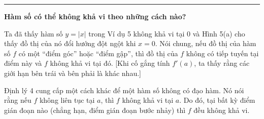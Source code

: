 \vspace{1.8em}
\noindent\textcolor{stewartblue}{\rule{1.25ex}{1.25ex}}\hspace{0.6em}%
{\large\textbf{\textsf{Hàm số có thể không khả vi theo những cách nào?}}}

\vspace{0.6em}
\noindent Ta đã thấy hàm số $y = |x|$ trong Ví dụ 5 không khả vi tại $0$ và Hình 5(a) cho thấy đồ thị của nó đổi hướng đột ngột khi $x = 0$. Nói chung, nếu đồ thị của hàm số $f$ có một ``điểm góc'' hoặc ``điểm gập'', thì đồ thị của $f$ không có tiếp tuyến tại điểm này và $f$ không khả vi tại đó. [Khi cố gắng tính $f'(a)$, ta thấy rằng các giới hạn bên trái và bên phải là khác nhau.]

Định lý 4 cung cấp một cách khác để một hàm số không có đạo hàm. Nó nói rằng nếu $f$ không liên tục tại $a$, thì $f$ không khả vi tại $a$. Do đó, tại bất kỳ điểm gián đoạn nào (chẳng hạn, điểm gián đoạn bước nhảy) thì $f$ đều không khả vi.
